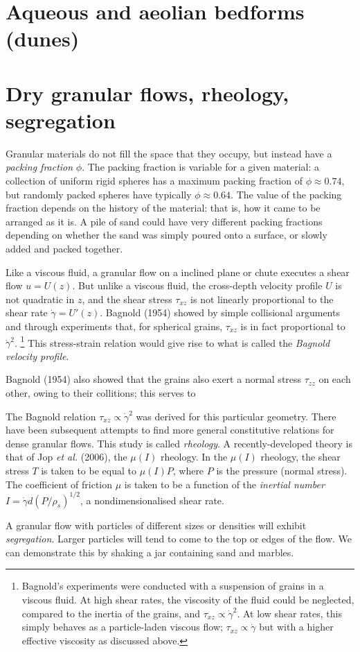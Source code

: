 \section{Aqueous and aeolian bedforms (dunes)}

\section{Dry granular flows, rheology, segregation}

Granular materials do not fill the space that they occupy, but instead have a
\textit{packing fraction} $\phi$. The packing fraction is variable for a given
material: a collection of uniform rigid spheres has a maximum packing fraction
of $\phi\approx0.74$, but randomly packed spheres have typically
$\phi\approx0.64$. The value of the packing fraction depends on the history of
the material: that is, how it came to be arranged as it is. A pile of sand could
have very different packing fractions depending on whether the sand was simply
poured onto a surface, or slowly added and packed together. 

Like a viscous fluid, a granular flow on a inclined plane or chute executes a
shear flow $u = U(z)$. But unlike a viscous fluid, the cross-depth velocity
profile $U$ is not quadratic in $z$, and the shear stress $\tau_{xz}$ is not linearly
proportional to the shear rate $\dot\gamma = U'(z)$. Bagnold (1954) showed by
simple collisional arguments and through experiments that, for spherical grains,
$\tau_{xz}$ is in fact proportional to $\dot\gamma^2$.\cite{bagnold-1954}
\footnote{Bagnold's experiments were conducted with a suspension of grains in a
viscous fluid. At high shear rates, the viscosity of the fluid could be
neglected, compared to the inertia of the grains, and $\tau_{xz}\propto\dot\gamma^2$.
At low shear rates, this simply behaves as a particle-laden viscous flow;
$\tau_{xz}\propto\dot\gamma$ but with a higher effective viscosity as discussed
above.}
This stress-strain relation would give rise to what is called the
\textit{Bagnold velocity profile}.

Bagnold (1954) also showed that the grains also exert a normal stress
$\tau_{zz}$ on each other, owing to their collitions; this serves to 

The Bagnold relation $\tau_{xz} \propto\dot\gamma^2$ was derived for this
particular geometry. There have been subsequent attempts to find more general
constitutive relations for dense granular flows. This study is called
\textit{rheology}. A recently-developed theory is that of Jop \textit{et al.}
(2006), the $\mu(I)$ rheology. In the $\mu(I)$ rheology, the shear stress $T$ is
taken to be equal to $\mu(I) P$, where $P$ is the pressure (normal stress). The
coefficient of friction $\mu$ is taken to be a function of the \textit{inertial
number} $I = \dot\gamma d (P / \rho_s)^{1/2}$, a nondimensionalised shear
rate.\cite{jop-2006}

A granular flow with particles of different sizes or densities will exhibit
\textit{segregation}. Larger particles will tend to come to the top or edges of
the flow. We can demonstrate this by shaking a jar containing sand and marbles. 

